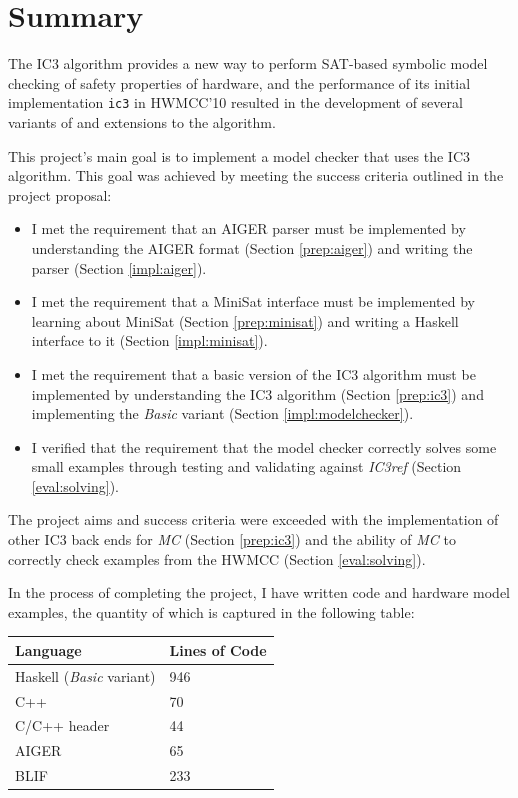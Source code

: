 \documentclass[12pt,a4paper,twoside,openright]{report}
\begin{document}
{{\section{Summary}
\label{conc:summary}

The IC3 algorithm provides a new way to perform SAT-based symbolic model checking of
safety properties of hardware, and the performance of its initial implementation
\verb,ic3, in HWMCC'10 resulted in the development of several variants of
and extensions to the algorithm.

This project's main goal is to implement a model checker that uses the IC3 algorithm.
This goal was achieved by meeting the success criteria outlined in
the project proposal:

\begin{itemize}
\item I met the requirement that an AIGER parser must be implemented by understanding
the AIGER format (Section \ref{prep:aiger}) and writing the parser (Section
\ref{impl:aiger}).
\item I met the requirement that a MiniSat interface must be implemented by
learning about MiniSat (Section \ref{prep:minisat}) and writing a Haskell
interface to it (Section \ref{impl:minisat}).
\item I met the requirement that a basic version of the IC3 algorithm must be
implemented by
understanding the IC3 algorithm (Section \ref{prep:ic3}) and implementing the
\emph{Basic} variant (Section \ref{impl:modelchecker}).
\item I verified that the requirement that the model checker correctly solves some small
examples through testing and validating against \emph{IC3ref}
(Section \ref{eval:solving}).
\end{itemize}

The project aims and success criteria were exceeded with the implementation of other
IC3 back ends for \emph{MC} (Section \ref{prep:ic3})
and the ability of \emph{MC} to correctly check examples
from the HWMCC (Section \ref{eval:solving}).

In the process of completing the project, I have written code and hardware model
examples, the quantity of which is captured in the following table:
\begin{center}
\begin{tabular}{| l | l |}
\hline
Language & Lines of Code\\
\hline
Haskell (\emph{Basic} variant) & 946\\
C++ & 70\\
C/C++ header & 44\\
AIGER & 65\\
BLIF & 233\\
\hline
\end{tabular}
\end{center}

}}
\end{document}
